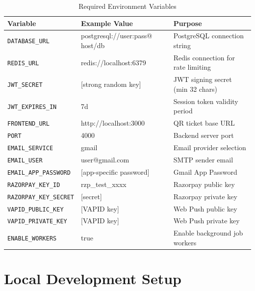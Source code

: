 \documentclass[12pt,a4paper]{report}
\begin{document}
\begin{table}[H]
    \centering
    \caption{Required Environment Variables}
    \vspace{0.2cm}
    \begin{tabular}{|p{4.5cm}|p{3.5cm}|p{5.5cm}|}
        \hline
        \textbf{Variable} & \textbf{Example Value} & \textbf{Purpose} \\
        \hline
        \texttt{DATABASE\_URL} & postgresql://user:pass@ host/db & PostgreSQL connection string \\
        \hline
        \texttt{REDIS\_URL} & redis://localhost:6379 & Redis connection for rate limiting \\
        \hline
        \texttt{JWT\_SECRET} & [strong random key] & JWT signing secret (min 32 chars) \\
        \hline
        \texttt{JWT\_EXPIRES\_IN} & 7d & Session token validity period \\
        \hline
        \texttt{FRONTEND\_URL} & http://localhost:3000 & QR ticket base URL \\
        \hline
        \texttt{PORT} & 4000 & Backend server port \\
        \hline
        \texttt{EMAIL\_SERVICE} & gmail & Email provider selection \\
        \hline
        \texttt{EMAIL\_USER} & user@gmail.com & SMTP sender email \\
        \hline
        \texttt{EMAIL\_APP\_PASSWORD} & [app-specific password] & Gmail App Password \\
        \hline
        \texttt{RAZORPAY\_KEY\_ID} & rzp\_test\_xxxx & Razorpay public key \\
        \hline
        \texttt{RAZORPAY\_KEY\_SECRET} & [secret] & Razorpay private key \\
        \hline
        \texttt{VAPID\_PUBLIC\_KEY} & [VAPID key] & Web Push public key \\
        \hline
        \texttt{VAPID\_PRIVATE\_KEY} & [VAPID key] & Web Push private key \\
        \hline
        \texttt{ENABLE\_WORKERS} & true & Enable background job workers \\
        \hline
    \end{tabular}
\end{table}

\section{Local Development Setup}
\end{document}
